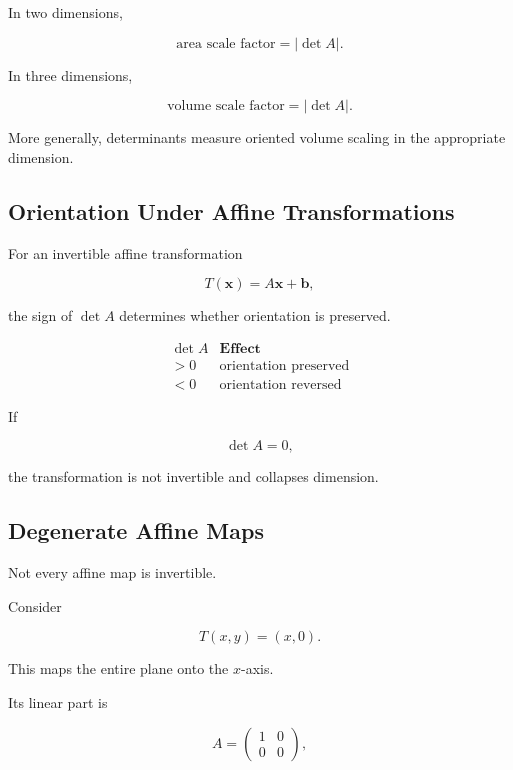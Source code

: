 In two dimensions,

\[
\boxed{
\text{area scale factor}=|\det A|.
}
\]

In three dimensions,

\[
\boxed{
\text{volume scale factor}=|\det A|.
}
\]

More generally, determinants measure oriented volume scaling in the
appropriate dimension.

\subsection{Orientation Under Affine Transformations}
\label{subsec:affine-orientation}

For an invertible affine transformation

\[ T(\mathbf{x})=A\mathbf{x}+\mathbf{b}, \]

the sign of \(\det A\) determines whether orientation is preserved.

\[
\begin{array}{c|c}
\det A & \textbf{Effect}\\
\hline
>0 & \text{orientation preserved}\\
<0 & \text{orientation reversed}
\end{array}
\]

If

\[ \det A=0, \]

the transformation is not invertible and collapses dimension.

\subsection{Degenerate Affine Maps}
\label{subsec:degenerate-affine-maps}

Not every affine map is invertible.

Consider

\[
T(x,y)=(x,0).
\]

This maps the entire plane onto the \(x\)-axis.

Its linear part is

\[
A=
\begin{pmatrix}
1&0\\
0&0
\end{pmatrix},
\]

